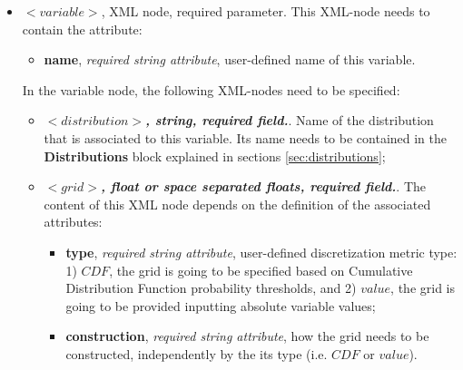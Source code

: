 \begin{itemize}
\item $<variable>$, XML node, required parameter. This XML-node needs to contain the attribute:
\begin{itemize}
  \item \textbf{name}, \textit{required string attribute}, user-defined name of this variable.
 \end{itemize}
 In the variable node, the following XML-nodes need to be specified:
 \begin{itemize}
    \item $<distribution>$\textbf{\textit{, string, required field.}}. Name of the distribution that is associated to this variable. Its name needs to be contained in the \textbf{Distributions} block explained in sections \ref{sec:distributions};
    \item $<grid>$\textbf{\textit{, float or space separated floats, required field.}}. The content of this XML node depends on the definition of the associated attributes:
\begin{itemize}
\itemsep0em
\item \textbf{type}, \textit{required string attribute}, user-defined discretization metric type: 1) $CDF$, the grid is going to be specified based on  Cumulative Distribution Function probability thresholds, and 2) $value$, the grid is going to be provided inputting absolute variable values;
\item \textbf{construction}, \textit{required string attribute}, how the grid needs to be constructed, independently by the its type (i.e. $CDF$ or $value$).
\end{itemize}


\end{itemize}
\end{itemize}
